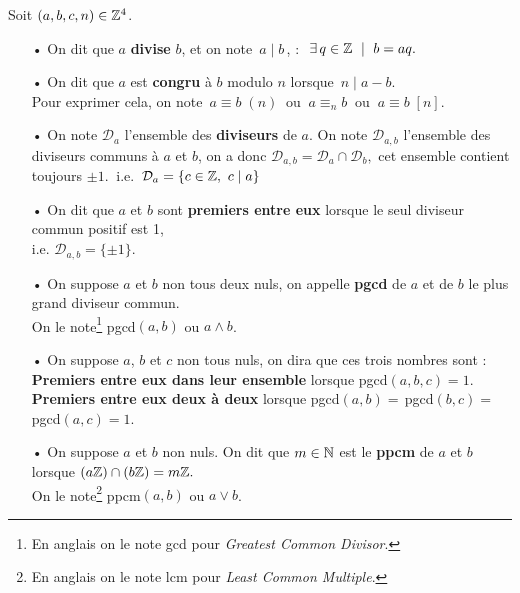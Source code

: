 Soit \((a,b,c,n)\in \mathbb{Z}^4\).
\begin{itemize}[leftmargin=0.5cm]
    \item[•] On dit que $a$ \textbf{divise} $b$, et on note \(\,a\mid b\,\), \ssi : \(\ \exists\,q\in \ZZ \ \mid \ b=aq.\)
    
    \item[•] On dit que $a$ est \textbf{congru} à $b$ modulo $n$ lorsque \(\,n\mid a-b\).\\
    Pour exprimer cela, on note \(\,a\equiv b\; (n)\ \) ou \(\ a\equiv_n \!b\ \) ou \(\ a\equiv b\; [n]\).

    \item[•] On note \(\mathcal{D}_a\) l'ensemble des \textbf{diviseurs} de $a$. On note \(\mathcal{D}_{a,b}\) l'ensemble des diviseurs communs à $a$ et $b$, on a donc \(\mathcal{D}_{a,b}=\mathcal{D}_a\cap \mathcal{D}_b,\) cet ensemble contient toujours \(\pm 1.\ \)
    i.e. \(\,\mathcal{D}_a=\{c\in \mathbb{Z},\ c\mid a\} \)

    \item[•] On dit que $a$ et $b$ sont \textbf{premiers entre eux} lorsque le seul diviseur commun positif est 1,\\
    i.e. \(\mathcal{D}_{a,b}=\{\pm 1\}\).
    
    \item[•] On suppose $a$ et $b$ non tous deux nuls, on appelle \textbf{pgcd} de $a$ et de $b$ le plus grand diviseur commun.\\
    On le note\footnote{En anglais on le note gcd pour \emph{Greatest Common Divisor}.} pgcd$(a,b)$ ou $a\land b$.

    \item[•] On suppose $a$, $b$ et $c$ non tous nuls, on dira que ces trois nombres sont :\\
    \textbf{Premiers entre eux dans leur ensemble} lorsque pgcd\((a,b,c)=1.\)\\
    \textbf{Premiers entre eux deux à deux} lorsque pgcd$(a,b)=\,$pgcd$(b,c)=\,$pgcd$(a,c)=1.$

    \item[•] On suppose $a$ et $b$ non nuls. On dit que $m\in \mathbb{N}$\expo{*} est le \textbf{ppcm} de $a$ et $b$ lorsque \((a\mathbb{Z})\cap(b\mathbb{Z})=m\mathbb{Z}.\)\\
    On le note\footnote{En anglais on le note lcm pour \emph{Least Common Multiple}.} ppcm$(a,b)$ ou $a\lor b$.
\end{itemize}

